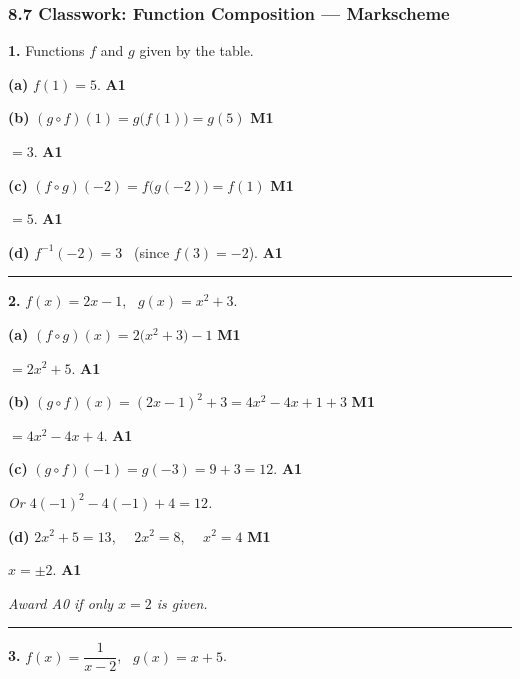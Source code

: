\documentclass[12pt, twoside]{article}
\begin{document}
\subsubsection*{8.7 Classwork: Function Composition --- Markscheme}

\medskip

\noindent\textbf{1.} Functions $f$ and $g$ given by the table.

\medskip

\textbf{(a)} $f(1)=5$. \hfill \textbf{A1}

\medskip

\textbf{(b)} $(g \circ f)(1)=g\big(f(1)\big)=g(5)$ \hfill \textbf{M1}

$=3$. \hfill \textbf{A1}

\medskip

\textbf{(c)} $(f \circ g)(-2)=f\big(g(-2)\big)=f(1)$ \hfill \textbf{M1}

$=5$. \hfill \textbf{A1}

\medskip

\textbf{(d)} $f^{-1}(-2)=3$ \ (since $f(3)=-2$). \hfill \textbf{A1}

\bigskip\hrule\bigskip

\noindent\textbf{2.} $f(x)=2x-1$, \ $g(x)=x^2+3$.

\medskip

\textbf{(a)} $(f \circ g)(x)=2\big(x^2+3\big)-1$ \hfill \textbf{M1}

$=2x^2+5$. \hfill \textbf{A1}

\medskip

\textbf{(b)} $(g \circ f)(x)=(2x-1)^2+3=4x^2-4x+1+3$ \hfill \textbf{M1}

$=4x^2-4x+4$. \hfill \textbf{A1}

\medskip

\textbf{(c)} $(g \circ f)(-1)=g(-3)=9+3=12$. \hfill \textbf{A1}

\emph{Or $4(-1)^2-4(-1)+4=12$.}

\medskip

\textbf{(d)} $2x^2+5=13$, \ \ $2x^2=8$, \ \ $x^2=4$ \hfill \textbf{M1}

$x=\pm 2$. \hfill \textbf{A1}

\emph{Award A0 if only $x=2$ is given.}

\bigskip\hrule\bigskip

\noindent\textbf{3.} $f(x)=\dfrac{1}{x-2}$, \ $g(x)=x+5$.

\medskip
\end{document}
